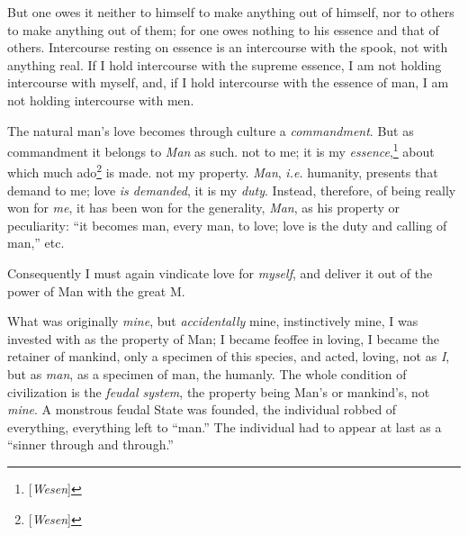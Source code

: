 \documentclass[12pt,a4paper]{book}
\begin{document}
But one owes it neither to himself to make anything out of himself, nor to 
others to make anything out of them; for one owes nothing to his essence and 
that of others. Intercourse resting on essence is an intercourse with the 
spook, not with anything real. If I hold intercourse with the supreme essence, 
I am not holding intercourse with myself, and, if I hold intercourse with the 
essence of man, I am not holding intercourse with men.

The natural man's love becomes through culture a \textit{commandment}. But as 
commandment it belongs to \textit{Man} as such. not to me; it is my 
\textit{essence},\footnote{[\textit{Wesen}]} about which much 
ado\footnote{[\textit{Wesen}]} is made. not my property. \textit{Man}, 
\textit{i.e.} humanity, presents that demand to me; love \textit{is demanded}, 
it is my \textit{duty}. Instead, therefore, of being really won for 
\textit{me}, it has been won for the generality, \textit{Man}, as his property 
or peculiarity: ``it becomes man, every man, to love; love is the duty and 
calling of man,'' etc.

Consequently I must again vindicate love for \textit{myself}, and deliver it 
out of the power of Man with the great M.

What was originally \textit{mine}, but \textit{accidentally} mine, 
instinctively mine, I was invested with as the property of Man; I became 
feoffee in loving, I became the retainer of mankind, only a specimen of this 
species, and acted, loving, not as \textit{I}, but as \textit{man}, as a 
specimen of man, the humanly. The whole condition of civilization is the 
\textit{feudal system}, the property being Man's or mankind's, not 
\textit{mine}. A monstrous feudal State was founded, the individual robbed of 
everything, everything left to ``man.'' The individual had to appear at last 
as a ``sinner through and through.''
\end{document}
